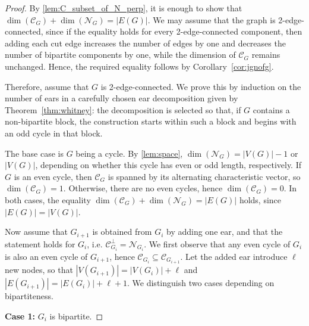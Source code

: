 \documentclass[10pt,a4paper]{amsart}
\newcommand{\cC}{\mathcal{C}}
\newcommand{\cN}{\mathcal{N}}
\begin{document}
\begin{proof}
    By \cref{lem:C_subset_of_N_perp}, it is enough to show that $\dim(\mathcal{C}_G) + \dim(\mathcal{N}_G) = |E(G)|$. We may assume that the graph is 2-edge-connected, since if the equality holds for every 2-edge-connected component, then adding each cut edge increases the number of edges by one and decreases the number of bipartite components by one, while the dimension of $\mathcal{C}_G$ remains unchanged. Hence, the required equality follows by Corollary~\ref{cor:jgnofg}.
    
    Therefore, assume that $G$ is 2-edge-connected. We prove this by induction on the number of ears in a carefully chosen ear decomposition given by Theorem~\ref{thm:whitney}: the decomposition is selected so that, if $G$ contains a non-bipartite block, the construction starts within such a block and begins with an odd cycle in that block.

    The base case is $G$ being a cycle. By \cref{lem:space}, $\dim(\cN_G) = |V(G)|-1$ or $|V(G)|$, depending on whether this cycle has even or odd length, respectively. If $G$ is an even cycle, then $\cC_G$ is spanned by its alternating characteristic vector, so $\dim(\cC_G)=1$. Otherwise, there are no even cycles, hence $\dim(\cC_G)=0$. In both cases, the equality $\dim(\cC_G) + \dim(\cN_G) = |E(G)|$ holds, since $|E(G)|=|V(G)|$.
    
    Now assume that $G_{i+1}$ is obtained from $G_i$ by adding one ear, and that the statement holds for $G_i$, i.e. $\cC_{G_i}^{\perp} = \cN_{G_i}$. We first observe that any even cycle of $G_i$ is also an even cycle of $G_{i+1}$, hence $\cC_{G_i} \subseteq \cC_{G_{i+1}}$. Let the added ear introduce $\ell$ new nodes, so that
    $|V(G_{i+1})| = |V(G_i)| + \ell$ and $|E(G_{i+1})| = |E(G_i)| + \ell + 1$. We distinguish two cases depending on bipartiteness.
    \medskip
    
    \noindent\textbf{Case 1:} $G_i$ is bipartite.
    

\end{proof}
\end{document}
